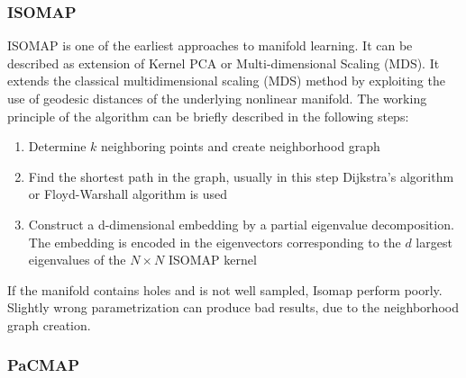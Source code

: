 \documentclass[12pt]{article}
\begin{document}
\subsubsection{ISOMAP}
ISOMAP is one of the earliest approaches to manifold learning. It can be described as extension of Kernel PCA or Multi-dimensional Scaling (MDS). It extends the classical multidimensional scaling (MDS) method by exploiting the use of geodesic distances of the underlying nonlinear manifold. The working principle of the algorithm can be briefly described in the following steps:
\begin{enumerate}
    \item Determine $k$ neighboring points and create neighborhood graph
    \item Find the shortest path in the graph, usually in this step Dijkstra’s algorithm or Floyd-Warshall algorithm is used
    \item Construct a d-dimensional embedding by a partial eigenvalue decomposition. The embedding is encoded in the eigenvectors corresponding to the $d$ largest eigenvalues of the $N\times N$ ISOMAP kernel\cite{scikit_isomap}
\end{enumerate}

If the manifold contains holes and is not well sampled, Isomap perform poorly. Slightly wrong parametrization can produce bad results, due to the neighborhood graph creation\cite{Pal:2018}.

\subsubsection{PaCMAP}
\end{document}
